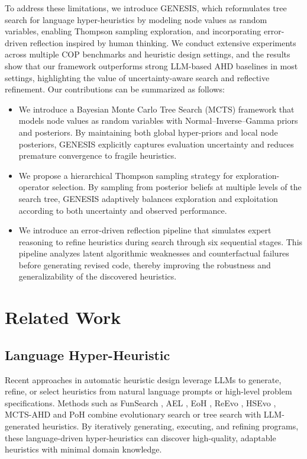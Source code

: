 \documentclass[sigconf,anonymous]{aamas}
\begin{document}
To address these limitations, we introduce GENESIS, which reformulates tree search for language hyper-heuristics by modeling node values as random variables, enabling Thompson sampling exploration, and incorporating error-driven reflection inspired by human thinking. We conduct extensive experiments across multiple COP benchmarks and heuristic design settings, and the results show that our framework outperforms strong LLM-based AHD baselines in most settings, highlighting the value of uncertainty-aware search and reflective refinement. Our contributions can be summarized as follows:
\begin{itemize}
    \item We introduce a Bayesian Monte Carlo Tree Search (MCTS) framework that models node values as random variables with Normal--Inverse--Gamma priors and posteriors. By maintaining both global hyper-priors and local node posteriors, GENESIS explicitly captures evaluation uncertainty and reduces premature convergence to fragile heuristics.
    \item We propose a hierarchical Thompson sampling strategy for exploration-operator selection. By sampling from posterior beliefs at multiple levels of the search tree, GENESIS adaptively balances exploration and exploitation according to both uncertainty and observed performance.
    \item We introduce an error-driven reflection pipeline that simulates expert reasoning to refine heuristics during search through six sequential stages. This pipeline analyzes latent algorithmic weaknesses and counterfactual failures before generating revised code, thereby improving the robustness and generalizability of the discovered heuristics.
\end{itemize}


\section{Related Work}

\subsection{Language Hyper-Heuristic}


Recent approaches in automatic heuristic design leverage LLMs to generate, refine, or select heuristics from natural language prompts or high-level problem specifications. Methods such as FunSearch \cite{FunSearch2023}, AEL \cite{liu2023algorithmevolutionusinglarge}, EoH \cite{fei2024eoh}, ReEvo \cite{ye2024reevo}, HSEvo \cite{dat2025hsevo}, MCTS-AHD \cite{zheng2025montecarlo} and PoH \cite{wang2025planningheuristicsstrategicplanning} combine evolutionary search or tree search with LLM-generated heuristics. By iteratively generating, executing, and refining programs, these language-driven hyper-heuristics can discover high-quality, adaptable heuristics with minimal domain knowledge. 
\end{document}
